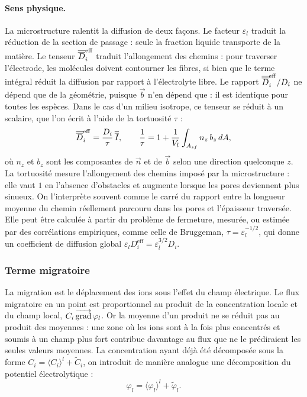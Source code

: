 \paragraph{Sens physique.} La microstructure ralentit la diffusion de deux
façons. Le facteur $\varepsilon_l$ traduit la réduction de la section de
passage : seule la fraction liquide transporte de la matière. Le tenseur
$\overline{\overline{D}}_i^{\mathrm{eff}}$ traduit l'allongement des chemins : pour traverser
l'électrode, les molécules doivent contourner les fibres, si bien que le terme
intégral réduit la diffusion par rapport à l'électrolyte libre. Le rapport
$\overline{\overline{D}}_i^{\mathrm{eff}}/D_i$ ne dépend que de la géométrie, puisque
$\vec{b}$ n'en dépend que : il est identique pour toutes les espèces. Dans le
cas d'un milieu isotrope, ce tenseur se réduit à un scalaire, que l'on écrit à
l'aide de la tortuosité $\tau$ :
\begin{equation}
\overline{\overline{D}}_i^{\mathrm{eff}} = \frac{D_i}{\tau}\,\overline{\overline{I}},
\qquad
\frac{1}{\tau} = 1 + \frac{1}{V_l}\int_{A_{sf}} n_z\, b_z\, dA ,
\label{eq:tortuosite}
\end{equation}
où $n_z$ et $b_z$ sont les composantes de $\vec{n}$ et de $\vec{b}$ selon une
direction quelconque $z$. La tortuosité mesure l'allongement des chemins
imposé par la microstructure : elle vaut $1$ en l'absence d'obstacles et
augmente lorsque les pores deviennent plus sinueux. On l'interprète souvent
comme le carré du rapport entre la longueur moyenne du chemin réellement
parcouru dans les pores et l'épaisseur traversée. Elle peut être calculée à
partir du problème de fermeture, mesurée, ou estimée par des corrélations
empiriques, comme celle de Bruggeman, $\tau = \varepsilon_l^{-1/2}$, qui donne
un coefficient de diffusion global $\varepsilon_l D_i^{\mathrm{eff}} =
\varepsilon_l^{3/2} D_i$.




\subsubsection*{Terme migratoire}

La migration est le déplacement des ions sous l'effet du champ électrique.
Le flux migratoire en un point est proportionnel au produit de la
concentration locale et du champ local, $C_i \mathop{\overrightarrow{\operatorname{grad}}}\nolimits \varphi_l$. Or la moyenne
d'un produit ne se réduit pas au produit des moyennes : une zone où les ions
sont à la fois plus concentrés et soumis à un champ plus fort contribue
davantage au flux que ne le prédiraient les seules valeurs moyennes.
La concentration
ayant déjà été décomposée sous la forme
$C_i=\langle C_i\rangle^l+\tilde C_i$, on introduit de manière analogue une
décomposition du potentiel électrolytique :
\begin{equation}
\varphi_l
=
\langle \varphi_l \rangle^l
+
\tilde{\varphi}_l .
\end{equation}

